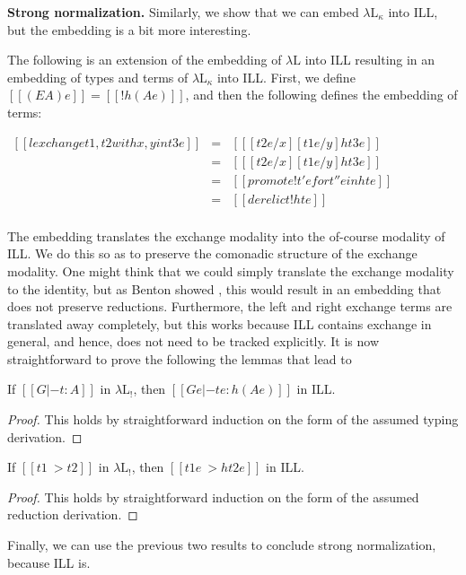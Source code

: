 \documentclass{entcs}
\begin{document}
\textbf{Strong normalization.}  Similarly, we show that we can embed
$\lambda\text{L}_\kappa$ into ILL, but the embedding is a bit more
interesting.

\begin{definition}
  \label{def:embed-lambda-L!-in-ILL}
  The following is an extension of the embedding of $\lambda\text{L}$
  into ILL resulting in an embedding of types and terms of
  $\lambda\text{L}_\kappa$ into ILL.  First, we define $[[(E A) e]] =
  [[! h(A e)]]$, and then the following defines the embedding of
  terms:
  \begin{center} \small
    \begin{math}
      \begin{array}{rlllllllllllllllllll}        
        [[{lexchange t1 , t2 with x , y in t3} e]] & = & [[ [t2 e/x][t1 e/y]h{t3 e}]]\\
        [[{rexchange t1 , t2 with x , y in t3} e]] & = & [[ [t2 e/x][t1 e/y]h{t3 e}]]\\
        [[{promoteE t' for t'' in t} e]] & = & [[promote! t' e for t'' e in h{t e}]]\\
        [[{derelictE t} e]] & = & [[derelict! h{t e}]]\\
      \end{array}
    \end{math}
  \end{center}
\end{definition}

The embedding  translates the exchange modality into the
of-course modality of ILL.  We do this so as to preserve the comonadic
structure of the exchange modality.  One might think that we could
simply translate the exchange modality to the identity, but as Benton
showed \cite{Benton:1995c}, this would result in an embedding that
does not preserve reductions.  Furthermore, the left and right
exchange terms are translated away completely, but this works because
ILL contains exchange in general, and hence, does not need to be
tracked explicitly.  It is now straightforward to prove the following the lemmas that lead to

\begin{lem}
  \label{lemma:type_preserving_embedding_lambdaLk}
  If $[[G |- t : A]]$ in $\lambda\text{L}_!$, then
  $[[G e |- t e : h(A e)]]$ in ILL.
\end{lem}
\begin{proof}
  This holds by straightforward induction on the form of the assumed
  typing derivation.
\end{proof}
\begin{lem}
  \label{lemma:reduction_preserving_embedding_lambdaLk}
  If $[[t1 ~> t2]]$ in $\lambda\text{L}_!$, then $[[t1 e ~> h{t2 e}]]$
  in ILL.
\end{lem}
\begin{proof}
  This holds by straightforward induction on the form of the assumed
  reduction derivation.
\end{proof}
\noindent
Finally, we can use the previous two results to conclude strong
normalization, because ILL is.
\end{document}
